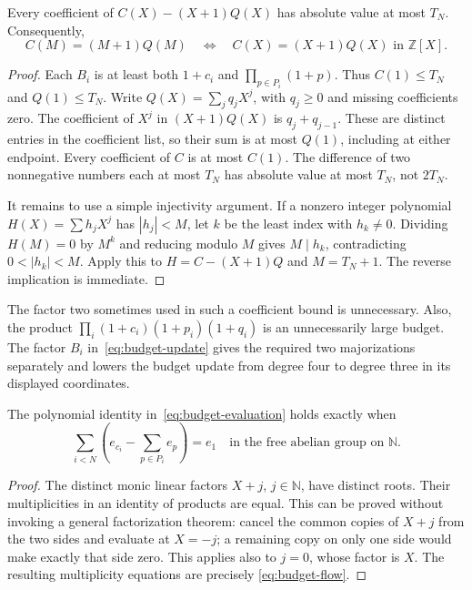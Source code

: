 \begin{budgetlemma}
Every coefficient of $C(X)-(X+1)Q(X)$ has absolute value at most $T_N$.
Consequently,
\begin{equation}
 C(M)=(M+1)Q(M)
 \quad\Longleftrightarrow\quad C(X)=(X+1)Q(X)\text{ in }\mathbb Z[X].
 \label{eq:budget-evaluation}
\end{equation}
\end{budgetlemma}
\begin{proof}
Each $B_i$ is at least both $1+c_i$ and
$\prod_{p\in P_i}(1+p)$.  Thus
$C(1)\leq T_N$ and $Q(1)\leq T_N$.
Write $Q(X)=\sum_j q_jX^j$, with $q_j\geq0$ and missing coefficients zero.
The coefficient of $X^j$ in $(X+1)Q(X)$ is $q_j+q_{j-1}$.
These are distinct entries in the coefficient list, so their sum is at
most $Q(1)$, including at either endpoint.  Every coefficient of $C$ is
at most $C(1)$.  The difference of two nonnegative numbers each at most
$T_N$ has absolute value at most $T_N$, not $2T_N$.

It remains to use a simple injectivity argument.  If a nonzero integer
polynomial $H(X)=\sum h_jX^j$ has $|h_j|<M$, let $k$ be the least index
with $h_k\ne0$.  Dividing $H(M)=0$ by $M^k$ and reducing modulo $M$ gives
$M\mid h_k$, contradicting $0<|h_k|<M$.  Apply this to
$H=C-(X+1)Q$ and $M=T_N+1$.  The reverse implication is immediate.
\end{proof}

The factor two sometimes used in such a coefficient bound is unnecessary.
Also, the product
$\prod_i(1+c_i)(1+p_i)(1+q_i)$ is an unnecessarily large budget.
The factor $B_i$ in~\eqref{eq:budget-update} gives the required two
majorizations separately and lowers the budget update from degree four to
degree three in its displayed coordinates.

\begin{budgetlemma}
The polynomial identity in~\eqref{eq:budget-evaluation} holds exactly when
\begin{equation}
 \sum_{i<N}\left(e_{c_i}-\sum_{p\in P_i}e_p\right)=e_1
 \quad\text{in the free abelian group on }\mathbb N.
 \label{eq:budget-flow}
\end{equation}
\end{budgetlemma}
\begin{proof}
The distinct monic linear factors $X+j$, $j\in\mathbb N$, have distinct
roots.  Their multiplicities in an identity of products are equal.
This can be proved without invoking a general factorization theorem:
cancel the common copies of $X+j$ from the two sides and evaluate at
$X=-j$; a remaining copy on only one side would make exactly that side
zero.  This applies also to $j=0$, whose factor is $X$.
The resulting multiplicity equations are precisely
\eqref{eq:budget-flow}.
\end{proof}

